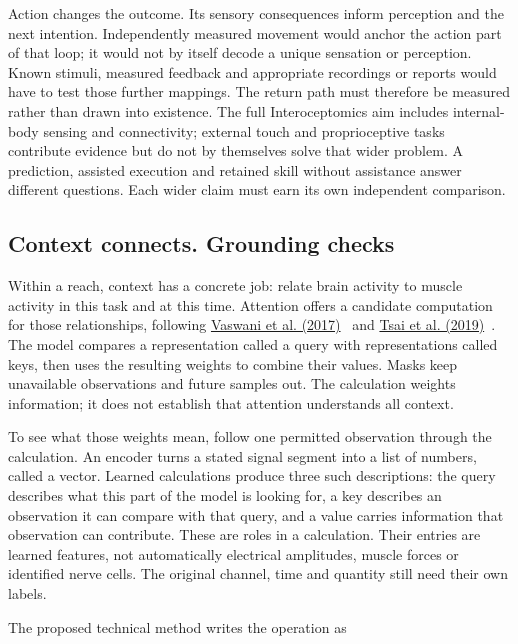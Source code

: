 Action changes the outcome. Its sensory consequences inform perception and
the next intention. Independently measured movement would anchor the action
part of that loop; it would not by itself decode a unique sensation or
perception. Known stimuli, measured feedback and appropriate recordings or
reports would have to test those further mappings. The return path must
therefore be measured rather than drawn into existence. The full
Interoceptomics aim includes internal-body sensing and connectivity; external
touch and proprioceptive tasks contribute evidence but do not by themselves
solve that wider problem. A prediction, assisted execution and retained skill
without assistance answer different questions. Each wider claim must earn
its own independent comparison.

\subsection{Context connects. Grounding checks}
Within a reach, context has a concrete job: relate brain activity to muscle
activity in this task and at this time. Attention offers a candidate computation for those relationships, following
\href{https://arxiv.org/html/1706.03762v7}{Vaswani et al. (2017)}~\cite{vaswani2017} and \href{https://aclanthology.org/P19-1656/}{Tsai et al. (2019)}~\cite{tsai2019}. The model compares a representation called a query with representations called keys, then uses the resulting weights to combine their values. Masks keep unavailable observations and future
samples out. The calculation weights information; it does not establish that
attention understands all context.

To see what those weights mean, follow one permitted observation through the
calculation. An encoder turns a stated signal segment into a list of numbers,
called a vector. Learned calculations produce three such descriptions: the
query describes what this part of the model is looking for, a key describes
an observation it can compare with that query, and a value carries information
that observation can contribute. These are roles in a calculation. Their
entries are learned features, not automatically electrical amplitudes, muscle
forces or identified nerve cells. The original channel, time and quantity
still need their own labels.

The proposed technical method writes the operation as

